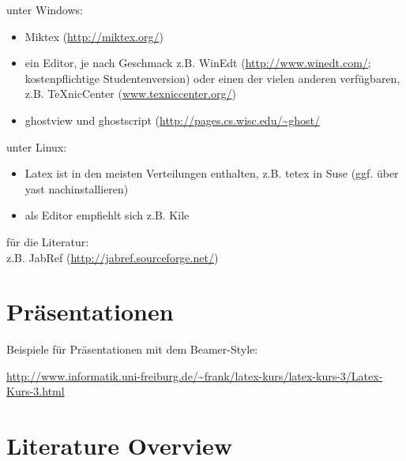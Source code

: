 \documentclass[a4paper,12pt]{article}
\begin{document}
unter Windows:
\begin{itemize}
   \item Miktex (\url{http://miktex.org/})
   \item ein Editor, je nach Geschmack z.B. WinEdt (\url{http://www.winedt.com/}; kostenpflichtige Studentenversion) oder einen der vielen anderen verf\"ugbaren, z.B. TeXnicCenter (\url{www.texniccenter.org/})
   \item ghostview und ghostscript (\url{http://pages.cs.wisc.edu/~ghost/}
\end{itemize}
unter Linux:
\begin{itemize}
   \item Latex ist in den meisten Verteilungen enthalten, z.B. tetex in Suse (ggf. \"uber yast nachinstallieren)
   \item als Editor empfiehlt sich z.B. Kile
\end{itemize}
f\"ur die Literatur:\\
z.B. JabRef (\url{http://jabref.sourceforge.net/})


\section{Pr\"asentationen}

Beispiele f\"ur Pr\"asentationen mit dem Beamer-Style:

\url{http://www.informatik.uni-freiburg.de/~frank/latex-kurs/latex-kurs-3/Latex-Kurs-3.html}


\section{Literature Overview}
\label{Chapter2}
\end{document}
